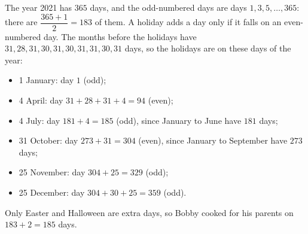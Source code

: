 The year 2021 has $365$ days, and the odd-numbered days are days $1,3,5,\dots,365$: there are $\dfrac{365+1}{2}=183$ of them. A holiday adds a day only if it falls on an even-numbered day. The months before the holidays have $31,28,31,30,31,30,31,31,30,31$ days, so the holidays are on these days of the year:
\begin{itemize}
\item 1 January: day $1$ (odd);
\item 4 April: day $31+28+31+4=94$ (even);
\item 4 July: day $181+4=185$ (odd), since January to June have $181$ days;
\item 31 October: day $273+31=304$ (even), since January to September have $273$ days;
\item 25 November: day $304+25=329$ (odd);
\item 25 December: day $304+30+25=359$ (odd).
\end{itemize}
Only Easter and Halloween are extra days, so Bobby cooked for his parents on $183+2=\boxed{185}$ days.
